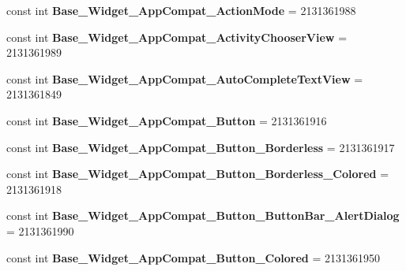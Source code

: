 \begin{DoxyCompactItemize}
\item 
\mbox{\label{classXaria_1_1Resource_1_1Style_a8f1b9224910734adab6585dacac3dbff}} 
const int {\bfseries Base\+\_\+\+Widget\+\_\+\+App\+Compat\+\_\+\+Action\+Mode} = 2131361988
\item 
\mbox{\label{classXaria_1_1Resource_1_1Style_ab5a2feadd5641b95c8be794c1b040f35}} 
const int {\bfseries Base\+\_\+\+Widget\+\_\+\+App\+Compat\+\_\+\+Activity\+Chooser\+View} = 2131361989
\item 
\mbox{\label{classXaria_1_1Resource_1_1Style_a03ea601314d9794f94ce7d857a5132c6}} 
const int {\bfseries Base\+\_\+\+Widget\+\_\+\+App\+Compat\+\_\+\+Auto\+Complete\+Text\+View} = 2131361849
\item 
\mbox{\label{classXaria_1_1Resource_1_1Style_a8d5056bbdcc9c0f9e3c230cfbee05aca}} 
const int {\bfseries Base\+\_\+\+Widget\+\_\+\+App\+Compat\+\_\+\+Button} = 2131361916
\item 
\mbox{\label{classXaria_1_1Resource_1_1Style_a15774cbe152ff453b8fe10407a59761a}} 
const int {\bfseries Base\+\_\+\+Widget\+\_\+\+App\+Compat\+\_\+\+Button\+\_\+\+Borderless} = 2131361917
\item 
\mbox{\label{classXaria_1_1Resource_1_1Style_a8ca6bc73143bddda2ed96c726315ed6c}} 
const int {\bfseries Base\+\_\+\+Widget\+\_\+\+App\+Compat\+\_\+\+Button\+\_\+\+Borderless\+\_\+\+Colored} = 2131361918
\item 
\mbox{\label{classXaria_1_1Resource_1_1Style_a6eadee3be9a3379d36f600ecbb985b45}} 
const int {\bfseries Base\+\_\+\+Widget\+\_\+\+App\+Compat\+\_\+\+Button\+\_\+\+Button\+Bar\+\_\+\+Alert\+Dialog} = 2131361990
\item 
\mbox{\label{classXaria_1_1Resource_1_1Style_ae86a1c0f965aa0e7b74cbed1ccc8e68c}} 
const int {\bfseries Base\+\_\+\+Widget\+\_\+\+App\+Compat\+\_\+\+Button\+\_\+\+Colored} = 2131361950
\item 
\mbox{\label{classXaria_1_1Resource_1_1Style_a1fe048661c8586efe1cc00e0443048a1}} 

\end{DoxyCompactItemize}
